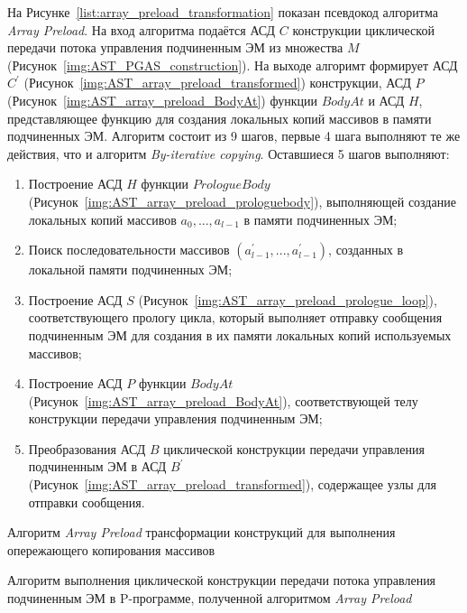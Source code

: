 На Рисунке~\ref{list:array_preload_transformation} показан псевдокод алгоритма \textit{Array Preload}. На вход алгоритма подаётся АСД $C$ конструкции циклической передачи потока управления подчиненным ЭМ из множества $M$ (Рисунок~\ref{img:AST_PGAS_construction}). На выходе алгоримт формирует АСД $C^{\prime}$ (Рисунок~\ref{img:AST_array_preload_transformed}) конструкции, АСД $P$ (Рисунок~\ref{img:AST_array_preload_BodyAt}) функции $BodyAt$ и АСД $H$, представляющее функцию для создания локальных копий массивов в памяти подчиненных ЭМ. Алгоритм состоит из 9 шагов, первые 4 шага выполняют те же действия, что и алгоритм \textit{By-iterative copying}. Оставшиеся 5 шагов выполняют:
\begin{enumerate}
\item Построение АСД $H$ функции $PrologueBody$ (Рисунок~\ref{img:AST_array_preload_prologuebody}), выполняющей создание локальных копий массивов $a_{0},...,a_{l-1}$ в памяти подчиненных ЭМ;
\item Поиск последовательности массивов $(a^{\prime}_{l-1},...,a^{\prime}_{l-1})$, созданных в локальной памяти подчиненных ЭМ;
\item Построение АСД $S$ (Рисунок~\ref{img:AST_array_preload_prologue_loop}), соответствующего прологу цикла, который выполняет отправку сообщения подчиненным ЭМ для создания в их памяти локальных копий используемых массивов;
\item Построение АСД $P$ функции $BodyAt$ (Рисунок~\ref{img:AST_array_preload_BodyAt}), соответствующей телу конструкции передачи управления подчиненным ЭМ;
\item Преобразования АСД $B$ циклической конструкции передачи управления подчиненным ЭМ в АСД $B^{\prime}$ (Рисунок~\ref{img:AST_array_preload_transformed}), содержащее узлы для отправки сообщения.
\end{enumerate}

\begin{algorithm}[!ht]
	
    \caption{Алгоритм \textit{Array Preload} трансформации конструкций для выполнения опережающего копирования массивов}
    \label{list:array_preload_transformation}
\end{algorithm}

\begin{algorithm}[!ht]
  
    \caption{Алгоритм выполнения циклической конструкции передачи потока управления подчиненным ЭМ в P-программе, полученной алгоритмом \textit{Array Preload}}
    \label{list:p-program_array_preload}
\end{algorithm}

